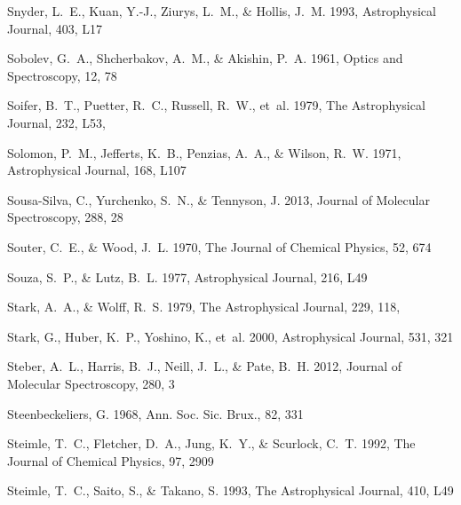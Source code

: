 \documentclass[twocolumn]{aastex631}
\begin{document}
\begin{thebibliography}{}
Snyder, L.~E., Kuan, Y.-J., Ziurys, L.~M., \& Hollis, J.~M. 1993, Astrophysical
  Journal, 403, L17

Sobolev, G.~A., Shcherbakov, A.~M., \& Akishin, P.~A. 1961, Optics and
  Spectroscopy, 12, 78

{Soifer}, B.~T., {Puetter}, R.~C., {Russell}, R.~W., {et~al.} 1979, The
  Astrophysical Journal, 232, L53, 

Solomon, P.~M., Jefferts, K.~B., Penzias, A.~A., \& Wilson, R.~W. 1971,
  Astrophysical Journal, 168, L107

Sousa-Silva, C., Yurchenko, S.~N., \& Tennyson, J. 2013, Journal of Molecular
  Spectroscopy, 288, 28

Souter, C.~E., \& Wood, J.~L. 1970, The Journal of Chemical Physics, 52, 674

Souza, S.~P., \& Lutz, B.~L. 1977, Astrophysical Journal, 216, L49

{Stark}, A.~A., \& {Wolff}, R.~S. 1979, The Astrophysical Journal, 229, 118,

Stark, G., Huber, K.~P., Yoshino, K., {et~al.} 2000, Astrophysical Journal,
  531, 321

Steber, A.~L., Harris, B.~J., Neill, J.~L., \& Pate, B.~H. 2012, Journal of
  Molecular Spectroscopy, 280, 3

Steenbeckeliers, G. 1968, Ann. Soc. Sic. Brux., 82, 331

Steimle, T.~C., Fletcher, D.~A., Jung, K.~Y., \& Scurlock, C.~T. 1992, The
  Journal of Chemical Physics, 97, 2909

Steimle, T.~C., Saito, S., \& Takano, S. 1993, The Astrophysical Journal, 410,
  L49


\end{thebibliography}
\end{document}
